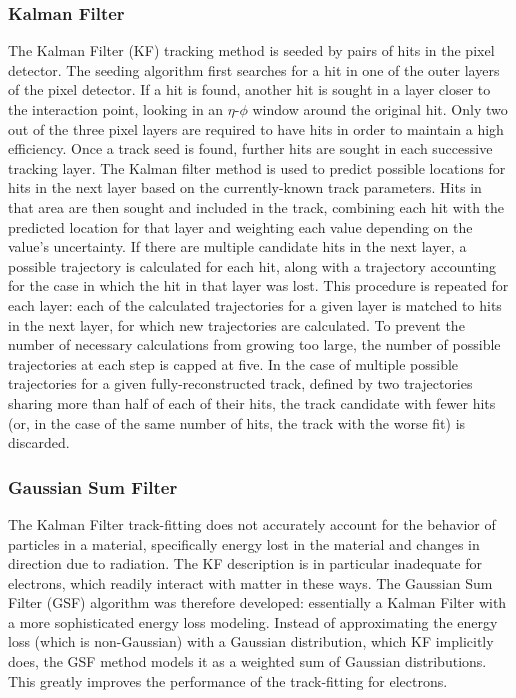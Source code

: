 \subsubsection{Kalman Filter}
\label{evReco:KF}
The Kalman Filter (KF) tracking method \cite{CMS-NOTE-2006-041} 
is seeded \cite{CMS-NOTE-2006-026}
by pairs of hits in the pixel detector.  
The seeding algorithm first searches for a hit 
in one of the outer layers of the pixel detector.  
If a hit is found, another hit is sought in a 
layer closer to the interaction point, 
looking in an $\eta$-$\phi$ window around 
the original hit.  
Only two out of the three pixel layers are 
required to have hits 
in order to maintain a high efficiency.  
Once a track seed is found, 
further hits are sought in each successive tracking layer. 
The Kalman filter method is used to predict possible 
locations for hits in the next layer based on 
the currently-known track parameters.%
Hits in that area are then sought and included 
in the track, combining each hit with the 
predicted location for that layer and weighting 
each value depending on the value's uncertainty.  
If there are multiple candidate hits in the next layer, 
a possible trajectory is calculated for each hit, 
along with a trajectory accounting for the case 
in which the hit in that layer was lost.  
This procedure is repeated for each layer: 
each of the calculated trajectories for a given layer 
is matched to hits in the next layer, 
for which new trajectories are calculated.  
To prevent the number of necessary calculations 
from growing too large, 
the number of possible trajectories at each step 
is capped at five.  
In the case of multiple possible trajectories 
for a given fully-reconstructed track, 
defined by two trajectories sharing more than 
half of each of their hits,
the track candidate with fewer hits 
(or, in the case of the same number of hits, 
the track with the worse fit)
is discarded.  

\subsubsection{Gaussian Sum Filter}
\label{evReco:GSF}

The Kalman Filter track-fitting does not accurately 
account for the behavior of particles in a material, 
specifically energy lost in the material 
and changes in direction due to radiation.  
The KF description is in particular inadequate 
for electrons, which 
readily interact with matter in these ways.  
The Gaussian Sum Filter (GSF) algorithm 
\cite{CMS-NOTE-2005-001} was 
therefore developed:
essentially a Kalman Filter 
with a more sophisticated energy loss modeling.   
Instead of approximating the energy loss 
(which is non-Gaussian)
with a Gaussian distribution, 
which KF implicitly does, 
the GSF method models it as a 
weighted sum of Gaussian distributions.  
This greatly improves the performance 
of the track-fitting for electrons.  

